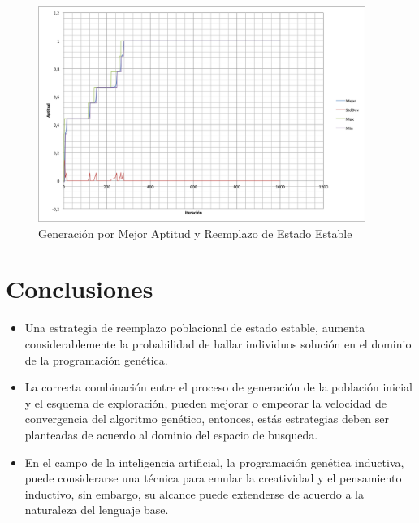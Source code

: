 \documentclass{llncs}
\begin{document}
\begin{figure}
  \centering
    \includegraphics[width=0.95\textwidth]{GPBestFitSteady}
  \caption{Generación por Mejor Aptitud  y Reemplazo de Estado Estable}
  \label{Ejecucion_2}
\end{figure}


\section{Conclusiones}

\begin{itemize}
\item Una estrategia de reemplazo poblacional de estado estable, aumenta considerablemente la probabilidad de hallar individuos solución en el dominio de la programación genética.
\item La correcta combinación entre el proceso de generación de la población inicial y el esquema de exploración,  pueden mejorar o empeorar la velocidad de convergencia del algoritmo genético, entonces, estás estrategias deben ser planteadas de acuerdo al dominio del espacio de busqueda.
\item En el campo de la inteligencia artificial, la programación genética inductiva, puede considerarse una técnica para emular la creatividad y el pensamiento inductivo, sin embargo, su alcance puede extenderse de acuerdo a la naturaleza del lenguaje base.
\end{itemize}
\end{document}
